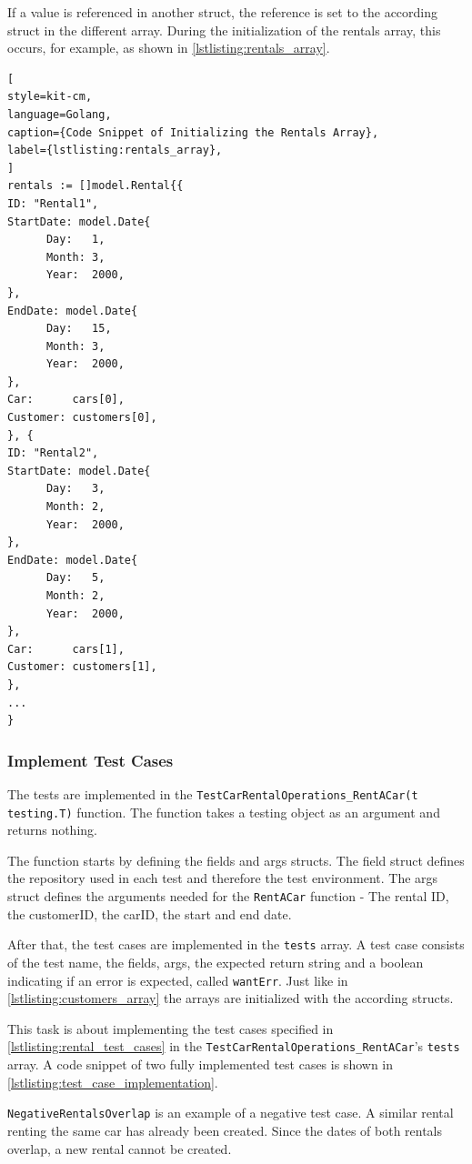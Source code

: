 If a value is referenced in another struct, the reference is set to the according struct in the different array.
During the initialization of the rentals array, this occurs, for example, as shown in \autoref{lstlisting:rentals_array}.

\begin{lstlisting}[
style=kit-cm,
language=Golang,
caption={Code Snippet of Initializing the Rentals Array},
label={lstlisting:rentals_array},
]
rentals := []model.Rental{{
ID: "Rental1",
StartDate: model.Date{
      Day:   1,
      Month: 3,
      Year:  2000,
},
EndDate: model.Date{
      Day:   15,
      Month: 3,
      Year:  2000,
},
Car:      cars[0],
Customer: customers[0],
}, {
ID: "Rental2",
StartDate: model.Date{
      Day:   3,
      Month: 2,
      Year:  2000,
},
EndDate: model.Date{
      Day:   5,
      Month: 2,
      Year:  2000,
},
Car:      cars[1],
Customer: customers[1],
},
...
}
\end{lstlisting}

\subsubsection*{Implement Test Cases}
The tests are implemented in the \texttt{TestCarRentalOperations\_RentACar(t \*testing.T)} function.
The function takes a testing object as an argument and returns nothing.

The function starts by defining the fields and args structs.
The field struct defines the repository used in each test and therefore the test environment.
The args struct defines the arguments needed for the \texttt{RentACar} function - The rental ID, the customerID, the carID, the start and end date.

After that, the test cases are implemented in the \texttt{tests} array.
A test case consists of the test name, the fields, args, the expected return string and a boolean indicating if an error is expected, called \texttt{wantErr}.
Just like in \autoref{lstlisting:customers_array} the arrays are initialized with the according structs.

This task is about implementing the test cases specified in \autoref{lstlisting:rental_test_cases} in the \hfill \linebreak \texttt{TestCarRentalOperations\_RentACar}'s \texttt{tests} array.
A code snippet of two fully implemented test cases is shown in \autoref{lstlisting:test_case_implementation}.

\texttt{NegativeRentalsOverlap} is an example of a negative test case.
A similar rental renting the same car has already been created.
Since the dates of both rentals overlap, a new rental cannot be created.

